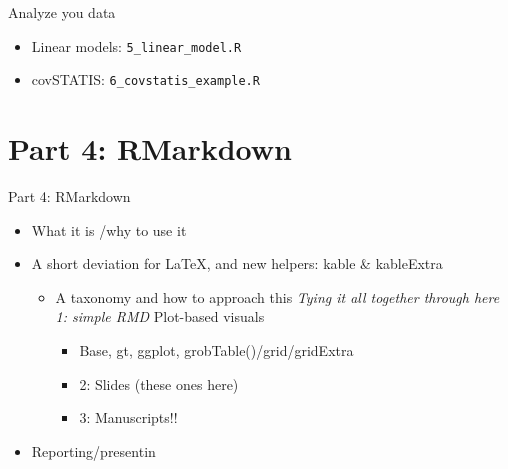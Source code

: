 \documentclass[
  ignorenonframetext,
]{beamer}
\providecommand{\tightlist}{%
  \setlength{\itemsep}{0pt}\setlength{\parskip}{0pt}}
\begin{document}
\begin{frame}[fragile]{Analyze you data}
\protect\hypertarget{analyze-you-data}{}

\begin{itemize}
\tightlist
\item
  Linear models: \texttt{5\_linear\_model.R}
\item
  covSTATIS: \texttt{6\_covstatis\_example.R}
\end{itemize}

\end{frame}

\hypertarget{part-4-rmarkdown}{%
\section{Part 4: RMarkdown}\label{part-4-rmarkdown}}

\begin{frame}{Part 4: RMarkdown}
\protect\hypertarget{part-4-rmarkdown-1}{}

\begin{itemize}
\tightlist
\item
  What it is /why to use it
\item
  A short deviation for LaTeX, and new helpers: kable \& kableExtra

  \begin{itemize}
  \tightlist
  \item
    A taxonomy and how to approach this \emph{Tying it all together
    through here 1: simple RMD }Plot-based visuals

    \begin{itemize}
    \tightlist
    \item
      Base, gt, ggplot, grobTable()/grid/gridExtra
    \item
      2: Slides (these ones here)
    \item
      3: Manuscripts!!
    \end{itemize}
  \end{itemize}
\item
  Reporting/presentin
\end{itemize}

\end{frame}
\end{document}
